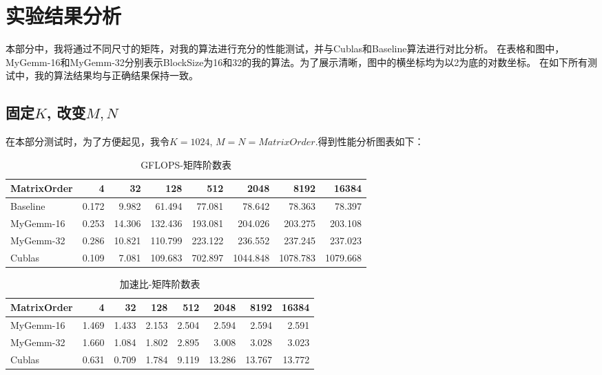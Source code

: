 \documentclass[UTF8]{article}
\begin{document}
\newpage
\section{实验结果分析}
本部分中，我将通过不同尺寸的矩阵，对我的算法进行充分的性能测试，并与Cublas和Baseline算法进行对比分析。
在表格和图中，MyGemm-16和MyGemm-32分别表示BlockSize为16和32的我的算法。为了展示清晰，图中的横坐标均为以2为底的对数坐标。
在如下所有测试中，我的算法结果均与正确结果保持一致。

\subsection{固定$K$, 改变$M, N$}
在本部分测试时，为了方便起见，我令$K=1024$, $M=N=Matrix Order$.得到性能分析图表如下：
\begin{table}[h]
    \centering
    \caption{GFLOPS-矩阵阶数表}
    \label{tab:my-table}
    \begin{tabular}{|l|r|r|r|r|r|r|r|}
    \hline
    MatrixOrder & 4     & 32     & 128     & 512     & 2048     & 8192     & 16384    \\ \hline
    Baseline    & 0.172 & 9.982  & 61.494  & 77.081  & 78.642   & 78.363   & 78.397   \\ \hline
    MyGemm-16   & 0.253 & 14.306 & 132.436 & 193.081 & 204.026  & 203.275  & 203.108  \\ \hline
    MyGemm-32   & 0.286 & 10.821 & 110.799 & 223.122 & 236.552  & 237.245  & 237.023  \\ \hline
    Cublas      & 0.109 & 7.081  & 109.683 & 702.897 & 1044.848 & 1078.783 & 1079.668 \\ \hline
    \end{tabular}
    \end{table}
    \begin{table}[h]
        \caption{加速比-矩阵阶数表}
        \label{tab:my-table}
    \centering

        \begin{tabular}{|l|r|r|r|r|r|r|r|}
        \hline
        MatrixOrder & 4        & 32       & 128      & 512      & 2048      & 8192      & 16384     \\ \hline
        MyGemm-16   & 1.469 & 1.433 & 2.153 & 2.504 & 2.594 & 2.594 & 2.591 \\ \hline
        MyGemm-32   & 1.660    & 1.084    & 1.802    & 2.895    & 3.008     & 3.028     & 3.023     \\ \hline
        Cublas      & 0.631    & 0.709    & 1.784    & 9.119    & 13.286    & 13.767    & 13.772    \\ \hline
        \end{tabular}
        \end{table}
\end{document}
